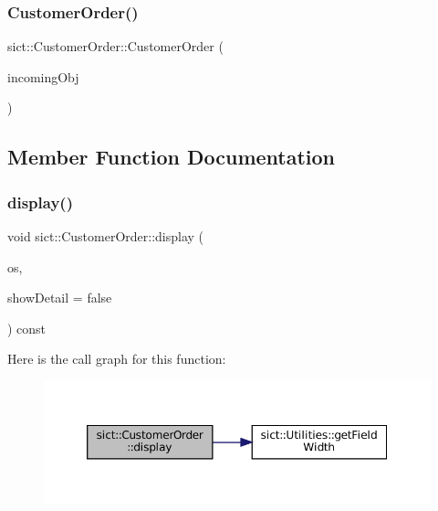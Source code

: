 \subsubsection{\texorpdfstring{CustomerOrder()}{CustomerOrder()}\hspace{0.1cm}{\footnotesize\ttfamily [3/3]}}
{\footnotesize\ttfamily sict\+::\+Customer\+Order\+::\+Customer\+Order (\begin{DoxyParamCaption}\item[{\mbox{\hyperlink{classsict_1_1CustomerOrder}{Customer\+Order}} \&\&}]{incoming\+Obj }\end{DoxyParamCaption})}



\subsection{Member Function Documentation}
\mbox{\label{classsict_1_1CustomerOrder_a76b1be8cf0608e0778460f5f58657d5a}} 
\subsubsection{\texorpdfstring{display()}{display()}}
{\footnotesize\ttfamily void sict\+::\+Customer\+Order\+::display (\begin{DoxyParamCaption}\item[{std\+::ostream \&}]{os,  }\item[{bool}]{show\+Detail = {\ttfamily false} }\end{DoxyParamCaption}) const}

Here is the call graph for this function\+:
\nopagebreak
\begin{figure}[H]
\begin{center}
\leavevmode
\includegraphics[width=350pt]{classsict_1_1CustomerOrder_a76b1be8cf0608e0778460f5f58657d5a_cgraph}
\end{center}
\end{figure}
\mbox{\label{classsict_1_1CustomerOrder_a08ec1a2acdd124da489e2e9177349ffb}} 
